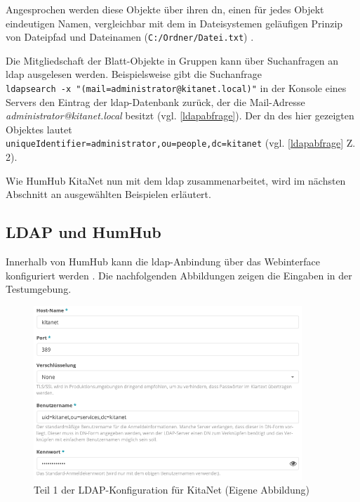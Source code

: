 Angesprochen werden diese Objekte über ihren \ac{dn}, einen für jedes Objekt eindeutigen Namen, vergleichbar mit dem in Dateisystemen geläufigen Prinzip von Dateipfad und Dateinamen (\zb \verb+C:/Ordner/Datei.txt+) \citep[vgl.][613]{Deimeke2019}. 

Die Mitgliedschaft der Blatt-Objekte in Gruppen kann über Suchanfragen an \ac{ldap} ausgelesen werden. Beispielsweise gibt die Suchanfrage\\ \verb+ldapsearch -x "(mail=administrator@kitanet.local)"+ in der Konsole eines Servers den Eintrag der \ac{ldap}-Datenbank zurück, der die Mail-Adresse \textit{administrator@kitanet.local} besitzt (vgl. \autoref{ldapabfrage}). Der \ac{dn} des hier gezeigten Objektes lautet \\ \verb+uniqueIdentifier=administrator,ou=people,dc=kitanet+ (vgl. \autoref{ldapabfrage} Z. 2).

Wie HumHub \bzw KitaNet nun mit dem \ac{ldap} zusammenarbeitet, wird im nächsten Abschnitt an ausgewählten Beispielen erläutert.

\subsection{LDAP und HumHub}

Innerhalb von HumHub kann die \ac{ldap}-Anbindung über das Webinterface konfiguriert werden \citep[vgl.][]{humldap}. Die nachfolgenden Abbildungen zeigen die Eingaben in der Testumgebung. 

\begin{figure}[H]
  \centering
  \includegraphics[width=0.9\textwidth]{res/ldapkitanet1.png}
  \caption{Teil 1 der LDAP-Konfiguration für KitaNet (Eigene Abbildung)}
  \label{fig:LDAP KitaNet Teil 1}
\end{figure}

